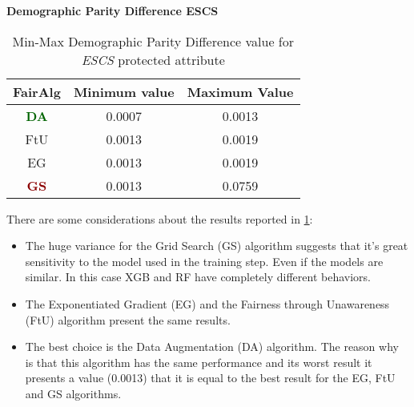 \textbf{Demographic Parity Difference ESCS}
\begin{table}
    \centering
    \begin{tabular}{|c|c|c|}
        \hline
        \textbf{FairAlg} & \textbf{Minimum value} & \textbf{Maximum Value} \\
        \hline
        \textcolor{darkgreen}{\textbf{DA}} & 0.0007 & 0.0013 \\
        \hline
        FtU & 0.0013 & 0.0019 \\
        \hline
        EG & 0.0013 & 0.0019 \\
        \hline
        \textcolor{darkred}{\textbf{GS}} & 0.0013 & 0.0759 \\
        \hline
    \end{tabular}
    \caption{Min-Max Demographic Parity Difference value for \emph{ESCS} protected attribute}
    \label{tab:e_dpd}
\end{table}

There are some considerations about the results reported in \cref{tab:e_dpd}:

\begin{itemize}

    \item The huge variance for the Grid Search (GS) algorithm suggests that it's great sensitivity to the model used in the training step. Even if the models are similar. In this case XGB and RF have completely different behaviors.

    \item The Exponentiated Gradient (EG) and the Fairness through Unawareness (FtU) algorithm present the same results.

    \item The best choice is the Data Augmentation (DA) algorithm. The reason why is that this algorithm has the same performance and its worst result it presents a value (0.0013) that it is equal to the best result for the EG, FtU and GS algorithms.
\end{itemize}